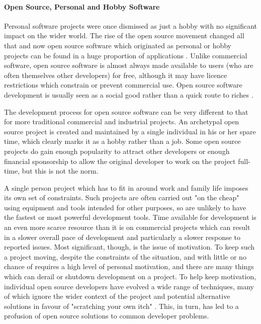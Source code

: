 \paragraph{Open Source, Personal and Hobby Software}

Personal software projects were once dismissed as just a hobby with no significant impact on the wider world.  The rise of the open source movement changed all that  and now open source software which originated as personal or hobby projects can be found in a huge proportion of applications . Unlike commercial software, open source software is almost always made available to users (who are often themselves other developers) for free, although it may have licence restrictions which constrain or prevent commercial use. Open source software development is usually seen as a social good rather than a quick route to riches .

The development process for open source software can be very different to that for more traditional commercial and industrial projects. An archetypal open source project is created and maintained by a single individual in his or her spare time, which clearly marks it as a hobby rather than a job. Some open source projects do gain enough popularity to attract other developers or enough financial sponsorship to allow the original developer to work on the project full-time, but this is not the norm.

A single person project which has to fit in around work and family life imposes its own set of constraints. Such projects are often carried out "on the cheap" using equipment and tools intended for other purposes, so are unlikely to have the fastest or most powerful development tools. Time available for development is an even more scarce resource than it is on commercial projects which can result in a slower overall pace of development and particularly a slower response to reported issues. Most significant, though, is the issue of motivation. To keep such a project moving, despite the constraints of the situation, and with little or no chance of requires a high level of personal motivation, and there are many things which can derail or shutdown development on a project. To help keep motivation, individual open source developers have evolved a wide range of techniques, many of which ignore the wider context of the project and potential alternative solutions in favour of "scratching your own itch" . This, in turn, has led to a profusion of open source solutions to common developer problems.

